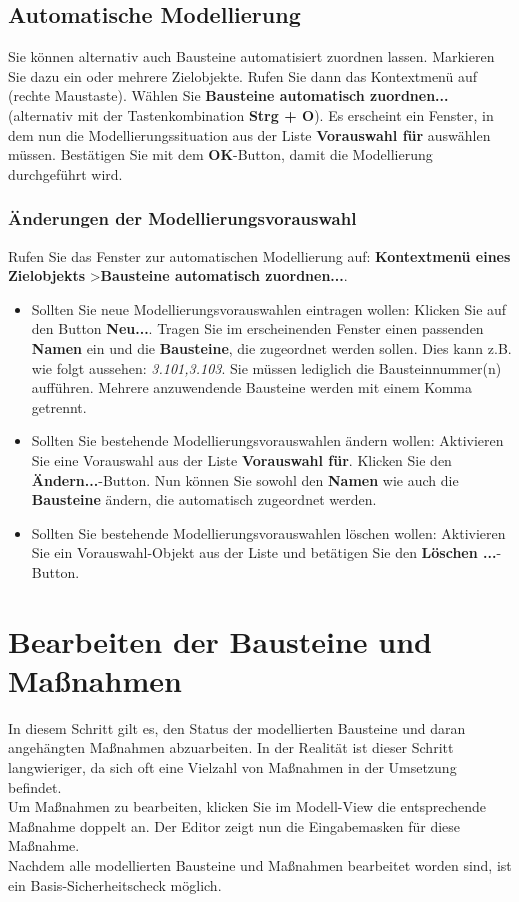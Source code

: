 \documentclass[a4paper,10pt]{book}
\begin{document}
\subsection{Automatische Modellierung}
Sie können alternativ auch Bausteine automatisiert zuordnen lassen. Markieren Sie dazu ein oder mehrere Zielobjekte.
Rufen Sie dann das Kontextmenü auf (rechte Maustaste). Wählen Sie \textbf{Bausteine automatisch zuordnen...}
(alternativ mit der Tastenkombination \textbf{Strg + O}). Es erscheint ein Fenster, in dem nun die Modellierungssituation aus der
Liste \textbf{Vorauswahl für} auswählen müssen. Bestätigen Sie mit dem \textbf{OK}-Button, damit die Modellierung durchgeführt wird.

\subsubsection{Änderungen der Modellierungsvorauswahl}
Rufen Sie das Fenster zur automatischen Modellierung auf: \textbf{Kontextmenü eines Zielobjekts} \textgreater \textbf{Bausteine automatisch zuordnen...}.
\begin{itemize}
 \item Sollten Sie neue Modellierungsvorauswahlen eintragen wollen: Klicken Sie auf den Button \textbf{Neu...}. Tragen Sie im erscheinenden Fenster einen passenden \textbf{Namen} ein und die \textbf{Bausteine}, die zugeordnet werden sollen. Dies kann z.B. wie folgt aussehen: \textit{3.101,3.103}. Sie müssen lediglich die Bausteinnummer(n) aufführen. Mehrere anzuwendende Bausteine werden mit einem Komma getrennt.
 \item Sollten Sie bestehende Modellierungsvorauswahlen ändern wollen: Aktivieren Sie eine Vorauswahl aus der Liste \textbf{Vorauswahl für}. Klicken Sie den \textbf{Ändern...}-Button. Nun können Sie sowohl den \textbf{Namen} wie auch die \textbf{Bausteine} ändern, die automatisch zugeordnet werden.
 \item Sollten Sie bestehende Modellierungsvorauswahlen löschen wollen: Aktivieren Sie ein Vorauswahl-Objekt aus der Liste und betätigen Sie den \textbf{Löschen ...}-Button.
\end{itemize}

\section{Bearbeiten der Bausteine und Maßnahmen}
In diesem Schritt gilt es, den Status der modellierten Bausteine und daran angehängten Maßnahmen abzuarbeiten. In der Realität ist
dieser Schritt langwieriger, da sich oft eine Vielzahl von Maßnahmen in der Umsetzung befindet.
\newline\\
Um Maßnahmen zu bearbeiten, klicken Sie im Modell-View die entsprechende Maßnahme doppelt an. Der Editor zeigt nun die Eingabemasken für diese Maßnahme.
\newline\\
Nachdem alle modellierten Bausteine und Maßnahmen bearbeitet worden sind, ist ein Basis-Sicherheitscheck möglich.
\end{document}
